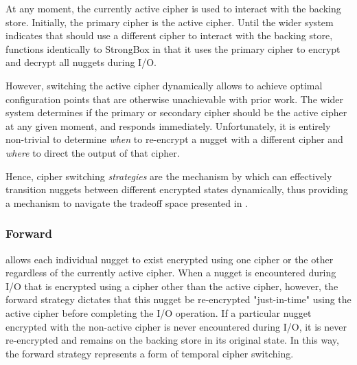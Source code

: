 At any moment, the currently active cipher is used to interact with the backing
store. Initially, the primary cipher is the active cipher. Until the wider
system indicates that \SYSTEM{} should use a different cipher to interact with
the backing store, \SYSTEM{} functions identically to StrongBox in that it uses
the primary cipher to encrypt and decrypt all nuggets during I/O.

However, switching the active cipher dynamically allows \SYSTEM{} to achieve
optimal configuration points that are otherwise unachievable with prior work.
The wider system determines if the primary or secondary cipher should be the
active cipher at any given moment, and \SYSTEM{} responds immediately.
Unfortunately, it is entirely non-trivial to determine \emph{when} to re-encrypt
a nugget with a different cipher and \emph{where} to direct the output of that
cipher. 

Hence, cipher switching \emph{strategies} are the mechanism by which \SYSTEM{}
can effectively transition nuggets between different encrypted states
dynamically, thus providing a mechanism to navigate the tradeoff space presented
in .  

\subsubsection{Forward}

\SYSTEM{} allows each individual nugget to exist encrypted using one cipher or
the other regardless of the currently active cipher. When a nugget is
encountered during I/O that is encrypted using a cipher other than the active
cipher, however, the forward strategy dictates that this nugget be re-encrypted
"just-in-time" using the active cipher before completing the I/O operation. If a
particular nugget encrypted with the non-active cipher is never encountered
during I/O, it is never re-encrypted and remains on the backing store in its
original state. In this way, the forward strategy represents a form of temporal
cipher switching.

